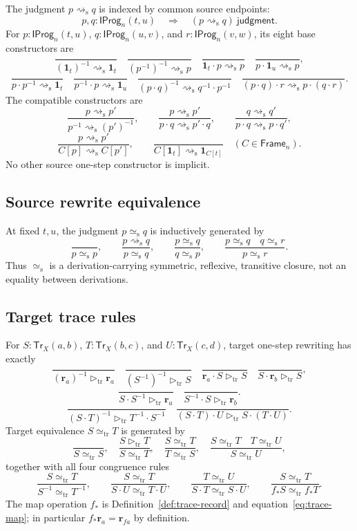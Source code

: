\documentclass[10pt,reqno]{amsart}
\newcommand{\Tr}{\mathsf{Tr}}
\newcommand{\TrStep}{\mathrel{\triangleright_{\mathrm{tr}}}}
\newcommand{\TrEq}{\mathrel{\simeq_{\mathrm{tr}}}}
\newcommand{\Frame}{\mathsf{Frame}}
\newcommand{\IProg}{\mathsf{IProg}}
\newcommand{\srw}{\mathrel{\rightsquigarrow_{\mathrm s}}}
\newcommand{\srweq}{\mathrel{\simeq_{\mathrm s}}}
\begin{document}
The judgment \(p\srw q\) is indexed by common source endpoints:
\[
 p,q:\IProg_n(t,u)\quad\Longrightarrow\quad
 (p\srw q)\ \mathsf{judgment}.
\]
For \(p:\IProg_n(t,u)\), \(q:\IProg_n(u,v)\), and
\(r:\IProg_n(v,w)\), its eight base constructors are
\[
\frac{}{(\mathbf1_t)^{-1}\srw\mathbf1_t}
\quad
\frac{}{(p^{-1})^{-1}\srw p}
\quad
\frac{}{\mathbf1_t\cdot p\srw p}
\quad
\frac{}{p\cdot\mathbf1_u\srw p},
\tag{B.1}\label{eq:app-source-units}
\]
\[
\frac{}{p\cdot p^{-1}\srw\mathbf1_t}
\quad
\frac{}{p^{-1}\cdot p\srw\mathbf1_u}
\quad
\frac{}{(p\cdot q)^{-1}\srw q^{-1}\cdot p^{-1}}
\quad
\frac{}{(p\cdot q)\cdot r\srw p\cdot(q\cdot r)}.
\tag{B.2}\label{eq:app-source-groupoid}
\]
The compatible constructors are
\[
\frac{p\srw p'}{p^{-1}\srw(p')^{-1}},
\qquad
\frac{p\srw p'}{p\cdot q\srw p'\cdot q},
\qquad
\frac{q\srw q'}{p\cdot q\srw p\cdot q'},
\tag{B.3}\label{eq:app-source-composition-congruence}
\]
\[
\frac{p\srw p'}{C[p]\srw C[p']},
\qquad
\frac{}{C[\mathbf1_t]\srw\mathbf1_{C[t]}}
\quad(C\in\Frame_n).
\tag{B.4}\label{eq:app-source-frame-congruence}
\]
No other source one-step constructor is implicit.

\subsection{Source rewrite equivalence}

At fixed \(t,u\), the judgment \(p\srweq q\) is inductively generated by
\[
\frac{}{p\srweq p},
\qquad
\frac{p\srw q}{p\srweq q},
\qquad
\frac{p\srweq q}{q\srweq p},
\qquad
\frac{p\srweq q\quad q\srweq r}{p\srweq r}.
\tag{B.5}\label{eq:app-source-equivalence}
\]
Thus \(\srweq\) is a derivation-carrying symmetric, reflexive, transitive
closure, not an equality between derivations.

\subsection{Target trace rules}

For \(S:\Tr_X(a,b)\), \(T:\Tr_X(b,c)\), and
\(U:\Tr_X(c,d)\), target one-step rewriting has exactly
\[
\frac{}{(\mathbf r_a)^{-1}\TrStep\mathbf r_a}
\quad
\frac{}{(S^{-1})^{-1}\TrStep S}
\quad
\frac{}{\mathbf r_a\cdot S\TrStep S}
\quad
\frac{}{S\cdot\mathbf r_b\TrStep S},
\tag{B.6}\label{eq:app-target-units}
\]
\[
\frac{}{S\cdot S^{-1}\TrStep\mathbf r_a}
\quad
\frac{}{S^{-1}\cdot S\TrStep\mathbf r_b}.
\]
\[
\frac{}{(S\cdot T)^{-1}\TrStep T^{-1}\cdot S^{-1}}
\quad
\frac{}{(S\cdot T)\cdot U\TrStep S\cdot(T\cdot U)}.
\tag{B.7}\label{eq:app-target-groupoid}
\]
Target equivalence \(S\TrEq T\) is generated by
\[
\frac{}{S\TrEq S},
\quad
\frac{S\TrStep T}{S\TrEq T},
\quad
\frac{S\TrEq T}{T\TrEq S},
\quad
\frac{S\TrEq T\quad T\TrEq U}{S\TrEq U},
\tag{B.8}\label{eq:app-target-equivalence}
\]
together with all four congruence rules
\[
\frac{S\TrEq T}{S^{-1}\TrEq T^{-1}},
\qquad
\frac{S\TrEq T}{S\cdot U\TrEq T\cdot U},
\qquad
\frac{T\TrEq U}{S\cdot T\TrEq S\cdot U},
\qquad
\frac{S\TrEq T}{f_\ast S\TrEq f_\ast T}.
\tag{B.9}\label{eq:app-target-congruence}
\]
The map operation \(f_\ast\) is
Definition~\ref{def:trace-record} and equation~\eqref{eq:trace-map};
in particular \(f_\ast\mathbf r_a=\mathbf r_{fa}\) by definition.
\end{document}

